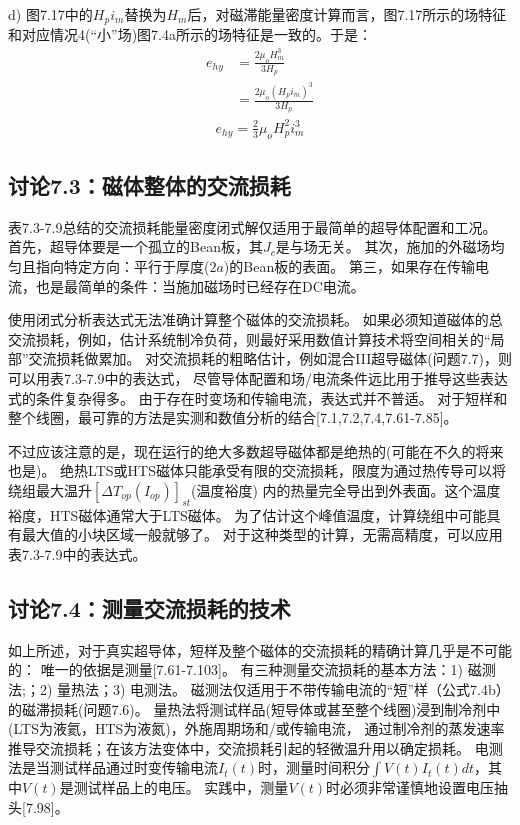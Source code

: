 d) 图7.17中的$H_p i_m$替换为$H_m$后，对磁滞能量密度计算而言，图7.17所示的场特征和对应情况4(“小”场)图7.4a所示的场特征是一致的。于是：
\begin{align*}%
e_{hy}&=\frac{2\mu_oH_{m}^{3}}{3H_p} \\ \tag{7.20a}
&=\frac{2\mu_o(H_pi_m)^3}{3H_p} 
\end{align*}
\begin{align*}
e_{hy}=\frac{2}{3}\mu_oH_{p}^{2}i_{m}^{3} \tag{7.26c}
\end{align*}


\subsection{讨论7.3：磁体整体的交流损耗}
表7.3-7.9总结的交流损耗能量密度闭式解仅适用于最简单的超导体配置和工况。
首先，超导体要是一个孤立的Bean板，其$J_c$是与场无关。
其次，施加的外磁场均匀且指向特定方向：平行于厚度($2a$)的Bean板的表面。
第三，如果存在传输电流，也是最简单的条件：当施加磁场时已经存在DC电流。

使用闭式分析表达式无法准确计算整个磁体的交流损耗。
如果必须知道磁体的总交流损耗，例如，估计系统制冷负荷，则最好采用数值计算技术将空间相关的“局部”交流损耗做累加。
对交流损耗的粗略估计，例如混合III超导磁体(问题7.7)，则可以用表7.3-7.9中的表达式，
尽管导体配置和场/电流条件远比用于推导这些表达式的条件复杂得多。
由于存在时变场和传输电流，表达式并不普适。
对于短样和整个线圈，最可靠的方法是实测和数值分析的结合[7.1,7.2,7.4,7.61-7.85]。

不过应该注意的是，现在运行的绝大多数超导磁体都是绝热的(可能在不久的将来也是)。
绝热LTS或HTS磁体只能承受有限的交流损耗，限度为通过热传导可以将绕组最大温升$[\Delta T_{op}(I_{op})]_{st}$(温度裕度)
内的热量完全导出到外表面。这个温度裕度，HTS磁体通常大于LTS磁体。
为了估计这个峰值温度，计算绕组中可能具有最大值的小块区域一般就够了。
对于这种类型的计算，无需高精度，可以应用表7.3-7.9中的表达式。


\subsection{讨论7.4：测量交流损耗的技术}
如上所述，对于真实超导体，短样及整个磁体的交流损耗的精确计算几乎是不可能的：
唯一的依据是测量[7.61-7.103]。
有三种测量交流损耗的基本方法：1) 磁测法;；2) 量热法；3) 电测法。
磁测法仅适用于不带传输电流的“短”样（公式7.4b）的磁滞损耗(问题7.6)。
量热法将测试样品(短导体或甚至整个线圈)浸到制冷剂中(LTS为液氦，HTS为液氮)，外施周期场和/或传输电流，
通过制冷剂的蒸发速率推导交流损耗；在该方法变体中，交流损耗引起的轻微温升用以确定损耗。
电测法是当测试样品通过时变传输电流$I_t(t)$时，测量时间积分$\int V(t)I_t(t)dt$，其中$V(t)$是测试样品上的电压。
实践中，测量$V(t)$时必须非常谨慎地设置电压抽头[7.98]。

